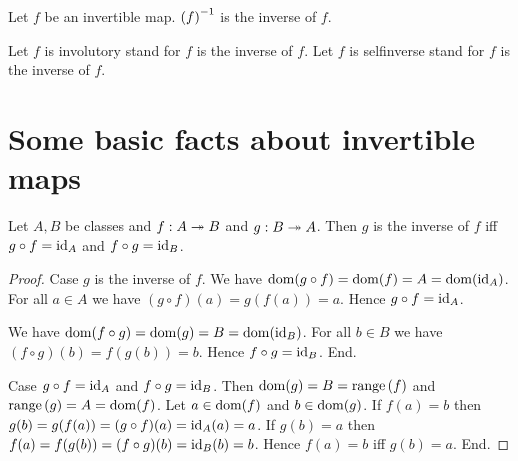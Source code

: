 \documentclass[../../set-theory/set-theory.tex]{subfiles}
\begin{document}
  \begin{forthel}
    \begin{definition}
      Let $f$ be an invertible map.
      $\left(f\right)^{-1}$ is the inverse of $f$.
    \end{definition}

    Let $f$ is involutory stand for $f$ is the inverse of $f$.
    Let $f$ is selfinverse stand for $f$ is the inverse of $f$.
  \end{forthel}


  \section{Some basic facts about invertible maps}

  \begin{forthel}
    \begin{proposition}
      Let $A, B$ be classes and $f : A \twoheadrightarrow B$ and $g : B \twoheadrightarrow A$.
      Then $g$ is the inverse of $f$ iff $g \circ f = \mathrm{id}_{A}$ and $f \circ g =
      \mathrm{id}_{B}$.
    \end{proposition}
    \begin{proof}
      Case $g$ is the inverse of $f$.
        We have
        $\operatorname{dom}(g \circ f)
          = \operatorname{dom}(f)
          = A
          = \operatorname{dom}(\mathrm{id}_{A})$.
        For all $a \in A$ we have
        $(g \circ f)(a)
          = g(f(a))
          = a$.
        Hence $g \circ f = \mathrm{id}_{A}$.

        We have
        $\operatorname{dom}(f \circ g)
          = \operatorname{dom}(g)
          = B
          = \operatorname{dom}(\mathrm{id}_{B})$.
        For all $b \in B$ we have
        $(f \circ g)(b)
          = f(g(b))
          = b$.
        Hence $f \circ g = \mathrm{id}_{B}$.
      End.

      Case $g \circ f = \mathrm{id}_{A}$ and $f \circ g = \mathrm{id}_{B}$.
        Then $\operatorname{dom}(g)
          = B
          = \mathrm{range}\left(f\right)$
        and $\mathrm{range}\left(g\right)
          = A
          = \operatorname{dom}(f)$.
        Let $a \in \operatorname{dom}(f)$ and $b \in \operatorname{dom}(g)$.
        If $f(a) = b$ then
        $g(b)
          = g(f(a))
          = (g \circ f)(a)
          = \mathrm{id}_{A}(a)
          = a$.
        If $g(b) = a$ then
        $f(a)
          = f(g(b))
          = (f \circ g)(b)
          = \mathrm{id}_{B}(b)
          = b$.
        Hence $f(a) = b$ iff $g(b) = a$.
      End.
    \end{proof}
  \end{forthel}
\end{document}
